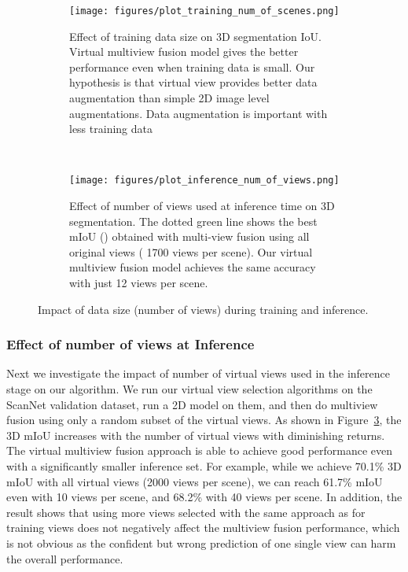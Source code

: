 \documentclass[runningheads]{llncs}
\begin{document}
\begin{figure}[bt]
\centering
  \begin{subfigure}[b]{0.48\textwidth}
    \texttt{[image: figures/plot\_training\_num\_of\_scenes.png]}
    \caption{Effect of training data size on 3D segmentation IoU. Virtual multiview fusion model gives the better performance even when training data is small. Our hypothesis is that virtual view provides better data augmentation than simple 2D image level augmentations. Data augmentation is important with less training data}
    \label{fig:train_size}
  \end{subfigure}
~
  \begin{subfigure}[b]{0.48\textwidth}
    \texttt{[image: figures/plot\_inference\_num\_of\_views.png]}
    \caption{Effect of number of views used at inference time on 3D segmentation. The dotted green line shows the best mIoU () obtained with multi-view fusion using all original views ( 1700 views per scene). Our virtual multiview fusion model achieves the same accuracy with just  12 views per scene.}
    \label{fig:inference_size}
  \end{subfigure}
  \caption{Impact of data size (number of views) during training and inference.}
\end{figure}


\subsubsection{Effect of number of views at Inference}

Next we investigate the impact of number of virtual views used in the inference stage on our algorithm. We run our virtual view selection algorithms on the ScanNet validation dataset, run a 2D model on them, and then do multiview fusion using only a random subset of the virtual views. As shown in Figure~\ref{fig:inference_size}, the 3D mIoU increases with the number of virtual views with diminishing returns. The virtual multiview fusion approach is able to achieve good performance even with a significantly smaller inference set. For example, while we achieve 70.1\% 3D mIoU with all virtual views (2000 views per scene), we can reach 61.7\% mIoU even with 10 views per scene, and 68.2\% with 40 views per scene. In addition, the result shows that using more views selected with the same approach as for training views does not negatively affect the multiview fusion performance, which is not obvious as the confident but wrong prediction of one single view can harm the overall performance.
\end{document}
